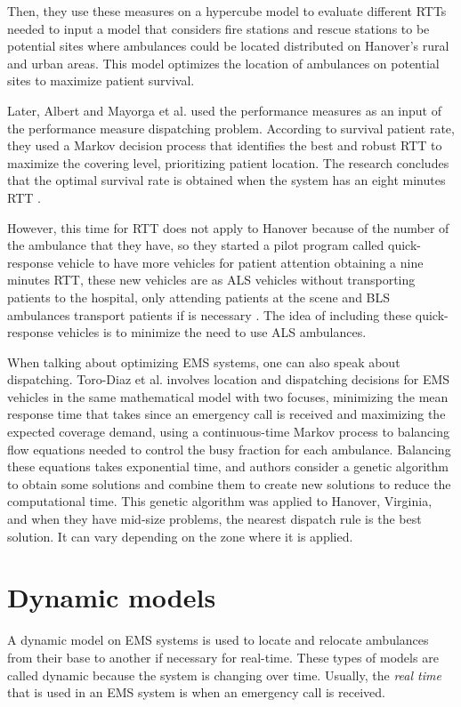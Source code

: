 Then, they use these measures on a hypercube model to evaluate different RTTs needed to input a model that considers fire stations and rescue stations to be potential sites where ambulances could be located distributed on Hanover's rural and urban areas. This model optimizes the location of ambulances on potential sites to maximize patient survival. 

Later, Albert and Mayorga et al. used the performance measures as an input of the performance measure dispatching problem. According to survival patient rate, they used a Markov decision process that identifies the best and robust RTT to maximize the covering level, prioritizing patient location. The research concludes that the optimal survival rate is obtained when the system has an eight minutes RTT \cite{mclay2011evaluating}. 

However, this time for RTT does not apply to Hanover because of the number of the ambulance that they have, so they started a pilot program called quick-response vehicle to have more vehicles for patient attention obtaining a nine minutes RTT, these new vehicles are as ALS vehicles without transporting patients to the hospital, only attending patients at the scene and BLS ambulances transport patients if is necessary \cite{mclay2012hanover}. The idea of including these quick-response vehicles is to minimize the need to use ALS ambulances.

When talking about optimizing EMS systems, one can also speak about dis\-pat\-ching. Toro-Diaz et al. \cite{toro2013joint} involves location and dispatching decisions for EMS vehicles in the same mathematical model with two focuses, minimizing the mean response time that takes since an emergency call is received and maximizing the expected coverage demand, using a continuous-time Markov process to balancing flow equations needed to control the busy fraction for each ambulance. Balancing these equations takes exponential time, and authors consider a genetic algorithm to obtain some solutions and combine them to create new solutions to reduce the computational time. This genetic algorithm was applied to Hanover, Virginia, and when they have mid-size problems, the nearest dispatch rule is the best solution. It can vary depending on the zone where it is applied.


\section{Dynamic models}

A dynamic model on EMS systems is used to locate and relocate ambulances from their base to another if necessary for real-time. These types of models are called dynamic because the system is changing over time. Usually, the \textit{real time} that is used in an EMS system is when an emergency call is received. 

